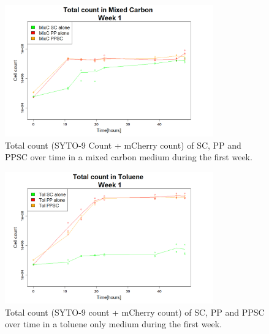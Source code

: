 \documentclass[a4paper, 10pt, conference]{ieeeconf}   %
\begin{document}
\begin{figure}
	\centering
	\includegraphics[width=9cm]{totcount_mixC1.PNG}
	\caption{Total count (SYTO-9 Count + mCherry count) of SC, PP and PPSC over time in a mixed carbon medium during the first week.}
	\label{totcountmixC1text}
\end{figure}

\begin{figure}
	\centering
	\includegraphics[width=9cm]{totcount_tol1.PNG}
	\caption{Total count (SYTO-9 count + mCherry count) of SC, PP and PPSC over time in a toluene only medium during the first week.}
	\label{totcounttol1text}
\end{figure}
\end{document}
